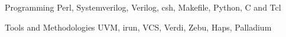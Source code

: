 


\begin{cvskills}


\cvskill
{Programming} %
{Perl, Systemverilog, Verilog, csh, Makefile, Python, C and Tcl} %


\cvskill
{Tools and Methodologies} %
{UVM, irun, VCS, Verdi, Zebu, Haps, Palladium} %


\end{cvskills}